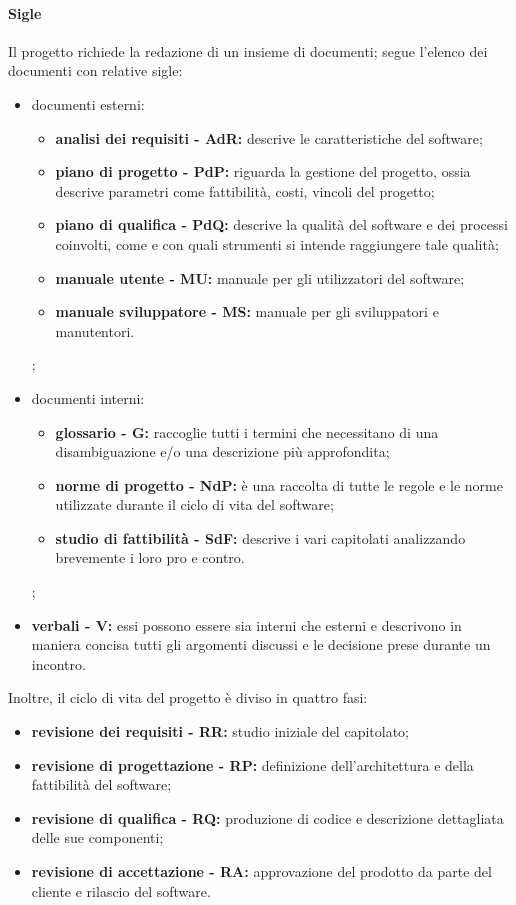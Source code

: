 			\paragraph{Sigle}
				Il progetto richiede la redazione di un insieme di documenti; segue l'elenco dei documenti con relative sigle:
				\begin{itemize}
					\item documenti esterni:
						\begin{itemize}
							\item \textbf{analisi dei requisiti - AdR:} descrive le caratteristiche del software;
							\item \textbf{piano di progetto - PdP:} riguarda la gestione del progetto, ossia descrive parametri come fattibilità, costi, vincoli del progetto;
							\item \textbf{piano di qualifica - PdQ:} descrive la qualità del software e dei processi coinvolti, come e con quali strumenti si intende raggiungere tale qualità;
							\item \textbf{manuale utente - MU:} manuale per gli utilizzatori del software;
							\item \textbf{manuale sviluppatore - MS:} manuale per gli sviluppatori e manutentori.
						\end{itemize};
					\item documenti interni:
						\begin{itemize}
							\item \textbf{glossario - G:} raccoglie tutti i termini che necessitano di una disambiguazione e/o una descrizione più approfondita;
							\item \textbf{norme di progetto - NdP:} è una raccolta di tutte le regole e le norme utilizzate durante il ciclo di vita del software;
							\item \textbf{studio di fattibilità - SdF:} descrive i vari capitolati analizzando brevemente i loro pro e contro.
						\end{itemize};
					\item \textbf{verbali - V:} essi possono essere sia interni che esterni e descrivono in maniera concisa tutti gli argomenti discussi e le decisione prese durante un incontro.
				\end{itemize}
				Inoltre, il ciclo di vita del progetto è diviso in quattro fasi:
				\begin{itemize}
					\item \textbf{revisione dei requisiti - RR:} studio iniziale del capitolato;
					\item \textbf{revisione di progettazione - RP:} definizione dell'architettura e della fattibilità del software;
					\item \textbf{revisione di qualifica - RQ:} produzione di codice e descrizione dettagliata delle sue componenti;
					\item \textbf{revisione di accettazione - RA:} approvazione del prodotto da parte del cliente e rilascio del software.
				\end{itemize}
